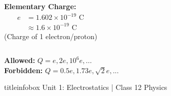 \begin{frame}
\begin{examplebox}
\begin{columns}[T]
    \textbf{Elementary Charge:}
    \begin{align*}
    e &= 1.602 \times 10^{-19} \text{ C}\\[0.15cm]
    &\approx 1.6 \times 10^{-19} \text{ C}
    \end{align*}
    \vspace{0.1cm}
    {\small (Charge of 1 electron/proton)}
\end{columns}
\end{examplebox}

\vspace{0.35cm}

\begin{importantbox}
\centering
\textbf{Allowed:} $Q = e, 2e, 10^6e, ...$\quad\textcolor{familiarGreen}{}\\[0.1cm]
\textbf{Forbidden:} $Q = 0.5e, 1.73e, \sqrt{2}e, ...$\quad\textcolor{importantRed}{}
\end{importantbox}

\vfill

\begin{beamercolorbox}[wd=\textwidth,ht=0.5cm,dp=0.1cm,center]{titleinfobox}
    \small\color{coolgray} Unit 1: Electrostatics | Class 12 Physics
\end{beamercolorbox}
\end{frame}

